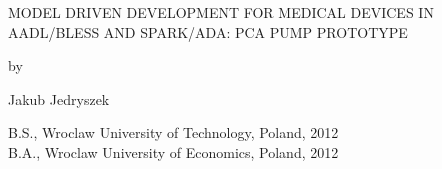 \begin{center}

   \vspace{1cm}


   \large MODEL DRIVEN DEVELOPMENT FOR MEDICAL DEVICES IN AADL/BLESS AND SPARK/ADA: PCA PUMP PROTOTYPE\\

   \vspace{0.3cm}

   by\\

   \vspace{0.3cm}


   \large Jakub Jedryszek\\

   \vspace{0.3cm}


   B.S., Wroclaw University of Technology, Poland, 2012\\
   B.A., Wroclaw University of Economics, Poland, 2012\\


\end{center}
